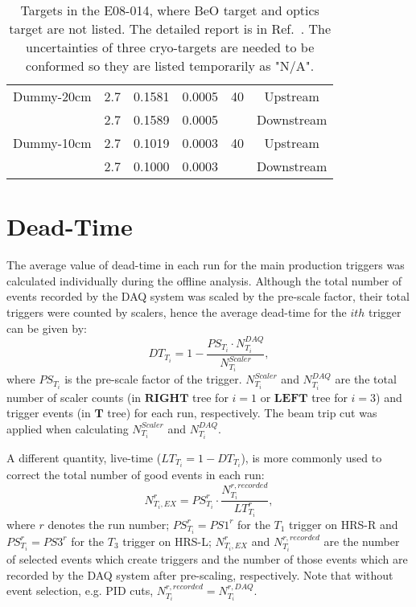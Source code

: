 \documentclass[a4paper,12.pt]{article}
\begin{document}
\begin{table}[htbp]
\begin{tabular}{lccccc}
   Dummy-20cm       &      2.7               & 0.1581        &     0.0005             &40           & Upstream  \\
                    &      2.7               & 0.1589        &     0.0005             &             & Downstream\\
   Dummy-10cm       &      2.7               & 0.1019        &     0.0003             &40           & Upstream  \\
                    &      2.7               & 0.1000        &     0.0003             &             & Downstream\\        
   \bottomrule
   \end{tabular}
  \caption[Targets in the E08-014]{\footnotesize{Targets in the E08-014, where BeO target and optics target are not listed. The detailed report is in Ref.~\cite{target_report}. The uncertainties of three cryo-targets are needed to be conformed so they are listed temporarily as "N/A". }}
  \label{target_table}
  \end{table}
  
\section{Dead-Time}
   The average value of dead-time in each run for the main production triggers was calculated individually during the offline analysis. Although the total number of events recorded by the DAQ system was scaled by the pre-scale factor, their total triggers were counted by scalers, hence the average dead-time for the $ith$ trigger can be given by:
\begin{equation}
  DT_{T_{i}} = 1 - \frac{PS_{T_{i}}\cdot N_{T_{i}}^{DAQ} }{N_{T_{i}}^{Scaler}},
  \label{eq_dt}
\end{equation}
where $PS_{T_{i}}$ is the pre-scale factor of the trigger. $N_{T_{i}}^{Scaler}$ and $N_{T_{i}}^{DAQ}$ are the total number of scaler counts (in $\mathbf{RIGHT}$ tree for $i=1$ or $\mathbf{LEFT}$ tree for $i=3$) and trigger events (in $\mathbf{T}$ tree) for each run, respectively. The beam trip cut was applied when calculating $N_{T_{i}}^{Scaler}$ and $N_{T_{i}}^{DAQ}$.

  A different quantity, live-time ($LT_{T_{i}} = 1 -DT_{T_{i}}$), is more commonly used to correct the total number of good events in each run:
 \begin{equation}
  N^{r}_{T_{i},EX} = PS^{r}_{T_{i}}\cdot \frac{N^{r,recorded}_{T_{i}}}{LT^{r}_{T_{i}}},
  \label{eq_lt}
 \end{equation}
where $r$ denotes the run number; $PS^{r}_{T_{i}}=PS1^{r}$ for the $T_{1}$ trigger on HRS-R and $PS^{r}_{T_{i}}=PS3^{r}$ for the $T_{3}$ trigger on HRS-L; $N^{r}_{T_{i},EX}$ and $N^{r,recorded}_{T_{i}}$ are the number of selected events which create triggers and the number of those events which are recorded by the DAQ system after pre-scaling, respectively. Note that without event selection, e.g. PID cuts, $N^{r,recorded}_{T_{i}}=N^{r,DAQ}_{T_{i}}$.
\end{document}
